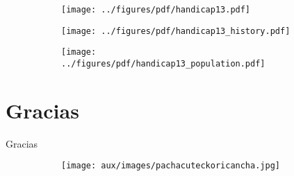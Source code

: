 \documentclass[shownotes]{beamer}
\begin{document}
\begin{frame}
  \begin{figure}[H]     
     \centering \normalsize
     \begin{subfigure}[b]{0.8\textwidth}
     \texttt{[image: ../figures/pdf/handicap13.pdf]} 
     \end{subfigure}
  \end{figure}
\end{frame}

\begin{frame}
  \begin{figure}[H]     
     \centering \normalsize
     \begin{subfigure}[b]{0.8\textwidth}
     \texttt{[image: ../figures/pdf/handicap13\_history.pdf]} 
     \end{subfigure}
  \end{figure}
\end{frame}

\begin{frame}
  \begin{figure}[H]     
     \centering \normalsize
     \begin{subfigure}[b]{0.8\textwidth}
     \texttt{[image: ../figures/pdf/handicap13\_population.pdf]} 
     \end{subfigure}
  \end{figure}
\end{frame}


\section{Gracias}

\begin{frame}
 
 \begin{center}
  \Large Gracias
 \end{center}

 \begin{figure}[H]     
     \centering
     \begin{subfigure}[b]{0.45\textwidth}
       \texttt{[image: aux/images/pachacuteckoricancha.jpg]} 
     \end{subfigure}
   \end{figure} 
  
\end{frame}
\end{document}
